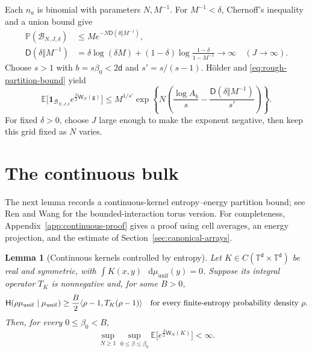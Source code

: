 \documentclass[11pt,reqno]{amsart}
\numberwithin{equation}{section}
\theoremstyle{plain}
\newtheorem{lemma}[lemma]{Lemma}
\theoremstyle{definition}
\DeclarePairedDelimiter{\ip}{\langle}{\rangle}
\renewcommand{\d}{\mathsf d}
\newcommand{\dd}{\mathop{}\!\mathrm d}
\newcommand{\T}{\mathbb T}
\newcommand{\E}{\mathbb E}
\newcommand{\Pb}{\mathbb P}
\newcommand{\one}{\mathbf 1}
\newcommand{\be}{\beta}
\newcommand{\g}{\mathsf g}
\newcommand{\Hr}{\mathsf H}
\newcommand{\muunif}{\mu_{\mathrm{unif}}}
\begin{document}
Each $n_a$ is binomial with parameters $N,M^{-1}$.  For $M^{-1}<\delta$, Chernoff's inequality and a union bound give
\begin{equation}
 \begin{aligned}
 \Pb(\mathcal B_{N,J,\delta})
 &\le M e^{-N\mathsf D(\delta\Vert M^{-1})},\\
 \mathsf D(\delta\Vert M^{-1})
 &=\delta\log(\delta M)
   +(1-\delta)\log\frac{1-\delta}{1-M^{-1}}
 \longrightarrow\infty\quad(J\to\infty).
 \end{aligned}
 \label{eq:physical-bad-probability}
\end{equation}
Choose $s>1$ with $b=s\be_0<2\d$ and $s'=s/(s-1)$.  H\"older and \eqref{eq:rough-partition-bound} yield
\begin{equation}
 \E\big[\one_{\mathcal B_{N,J,\delta}}e^{\frac\be2\mathsf W_N(\g)}\big]
 \le M^{1/s'}\exp\left\{N
 \left(\frac{\log A_b}{s}
       -\frac{\mathsf D(\delta\Vert M^{-1})}{s'}\right)\right\}.
 \label{eq:physical-bad-gibbs-bound}
\end{equation}
For fixed $\delta>0$, choose $J$ large enough to make the exponent negative, then keep this grid fixed as $N$ varies.

\section{The continuous bulk}
\label{sec:continuous-localized-reduction}
The next lemma records a continuous-kernel entropy--energy partition bound; see Ren and Wang \cite[Corollary~4 and Remark~3]{RenWang2025} for the bounded-interaction torus version.  For completeness, Appendix~\ref{app:continuous-proof} gives a proof using cell averages, an energy projection, and the estimate of Section~\ref{sec:canonical-arrays}.

\begin{lemma}[Continuous kernels controlled by entropy]
\label{lem:continuous-entropy-partition}
Let $K\in C(\T^\d\times\T^\d)$ be real and symmetric, with $\int K(x,y)\,\dd\muunif(y)=0$.  Suppose its integral operator $T_K$ is nonnegative and, for some $B>0$,
\begin{equation}
 \Hr(\rho\muunif\mid\muunif)
 \ge\frac B2\ip{\rho-1,T_K(\rho-1)}
 \quad\text{for every finite-entropy probability density }\rho.
 \label{eq:continuous-entropy-assumption}
\end{equation}
Then, for every $0\le\be_0<B$,
\begin{equation}
 \sup_{N\ge1}\sup_{0\le\be\le\be_0}
 \E\big[e^{\frac\be2\mathsf W_N(K)}\big]<\infty.
 \label{eq:continuous-partition-conclusion}
\end{equation}
\end{lemma}
\end{document}
